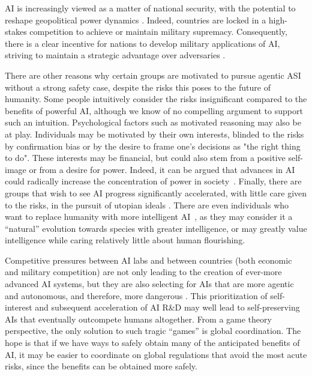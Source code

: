 AI is increasingly viewed as a matter of national security, with the potential to reshape geopolitical power dynamics \cite{ai.gov.wp.content.uploads.2024.10.NSM.Framework.to.Advance.AI.Governance.and.Risk.Management.in.National.Security.pdf,situational.awareness.ai.the.free.world.must.prevail}. Indeed, countries are locked in a high-stakes competition to achieve or maintain military supremacy. Consequently, there is a clear incentive for nations to develop military applications of AI, striving to maintain a strategic advantage over adversaries \cite{media.defense.gov.2019.feb.12.2002088963..1..1.1.summary.of.dod.ai.strategy.pdf,www.nato.pa.int.document.2024.nato.and.ai.report.clement.058.stc}.

There are other reasons why certain groups are motivated to pursue agentic ASI without a strong safety case, despite the risks this poses to the future of humanity. Some people intuitively consider the risks insignificant \cite{time.com.6694432.yann.lecun.meta.ai.interview} compared to the benefits of powerful AI, although we know of no compelling argument to support such an intuition. Psychological factors such as motivated reasoning \cite{kunda1990case} may also be at play. Individuals may be motivated by their own interests, blinded to the risks by confirmation bias or by the desire to frame one's decisions as "the right thing to do". These interests may be financial, but could also stem from a positive self-image or from a desire for power. Indeed, it can be argued that advances in AI could radically increase the concentration of power in society~\cite{bullock2024oxford}. Finally, there are groups that wish to see AI progress significantly accelerated, with little care given to the risks, in the pursuit of utopian ideals \cite{www.nytimes.com.2023.12.10.technology.ai.acceleration.html}. There are even individuals who want to replace humanity with more intelligent AI~\cite{arxiv.org.abs.2306.12001}, as they may consider it a ``natural'' evolution towards species with greater intelligence, or may greatly value intelligence while caring relatively little about human flourishing. 

Competitive pressures between AI labs and between countries (both economic and military competition) are not only leading to the creation of ever-more advanced AI systems, but they are also selecting for AIs that are more agentic and autonomous, and therefore, more dangerous \cite{arxiv.org.abs.2303.16200}. This prioritization of self-interest and subsequent acceleration of AI R\&D may well lead to self-preserving AIs that eventually outcompete humans altogether. From a game theory perspective, the only solution to such tragic “games” is global coordination. The hope is that if we have ways to safely obtain many of the anticipated benefits of AI, it may be easier to coordinate on global regulations that avoid the most acute risks, since the benefits can be obtained more safely.

